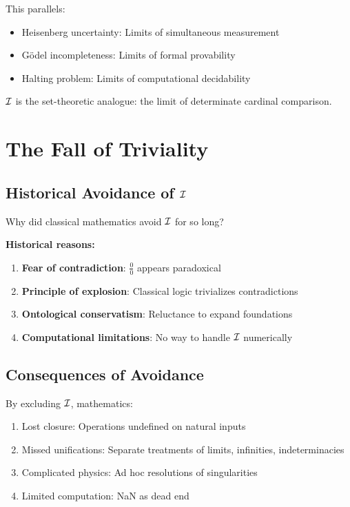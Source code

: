 This parallels:
\begin{itemize}
    \item Heisenberg uncertainty: Limits of simultaneous measurement
    \item Gödel incompleteness: Limits of formal provability
    \item Halting problem: Limits of computational decidability
\end{itemize}

$\mathcal{I}$ is the set-theoretic analogue: the limit of determinate cardinal comparison.

\section{The Fall of Triviality}

\subsection{Historical Avoidance of $\mathcal{I}$}

\begin{question}
Why did classical mathematics avoid $\mathcal{I}$ for so long?
\end{question}

\textbf{Historical reasons:}
\begin{enumerate}
    \item \textbf{Fear of contradiction}: $\frac{0}{0}$ appears paradoxical
    \item \textbf{Principle of explosion}: Classical logic trivializes contradictions
    \item \textbf{Ontological conservatism}: Reluctance to expand foundations
    \item \textbf{Computational limitations}: No way to handle $\mathcal{I}$ numerically
\end{enumerate}

\subsection{Consequences of Avoidance}

\begin{theorem}
By excluding $\mathcal{I}$, mathematics:
\begin{enumerate}
    \item Lost closure: Operations undefined on natural inputs
    \item Missed unifications: Separate treatments of limits, infinities, indeterminacies
    \item Complicated physics: Ad hoc resolutions of singularities
    \item Limited computation: NaN as dead end
\end{enumerate}
\end{theorem}

